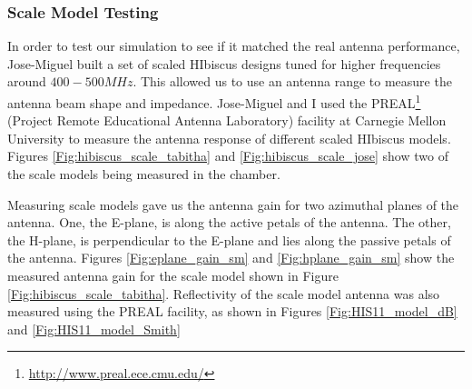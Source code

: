 \subsubsection{Scale Model Testing}

In order to test our simulation to see if it matched the real antenna performance, Jose-Miguel built a set of scaled HIbiscus designs tuned for higher frequencies around $400-500 MHz$. This allowed us to use an antenna range to measure the antenna beam shape and impedance. Jose-Miguel and I used the PREAL\footnote{\url{http://www.preal.ece.cmu.edu/}} (Project Remote Educational Antenna Laboratory) facility at Carnegie Mellon University to measure the antenna response of different scaled HIbiscus models. Figures \ref{Fig:hibiscus_scale_tabitha} and \ref{Fig:hibiscus_scale_jose} show two of the scale models being measured in the chamber.

Measuring scale models gave us the antenna gain for two azimuthal planes of the antenna. One, the E-plane, is along the active petals of the antenna. The other, the H-plane, is perpendicular to the E-plane and lies along the passive petals of the antenna. Figures \ref{Fig:eplane_gain_sm} and \ref{Fig:hplane_gain_sm} show the measured antenna gain for the scale model shown in Figure \ref{Fig:hibiscus_scale_tabitha}. Reflectivity of the scale model antenna was also measured using the PREAL facility, as shown in Figures \ref{Fig:HIS11_model_dB} and \ref{Fig:HIS11_model_Smith}

